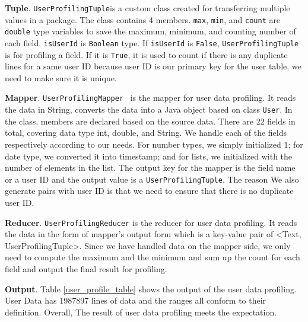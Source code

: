\documentclass{stylefiles/capstone}
\begin{document}
\textbf{Tuple}.
\texttt{UserProfilingTuple}is a custom class created for transferring multiple values in a package. The class contains 4 members. \texttt{max}, \texttt{min}, and \texttt{count} are \texttt{double} type variables to save the maximum, minimum, and counting number of each field. \texttt{isUserId} is \texttt{Boolean} type. If \texttt{isUserId} is \texttt{False}, \texttt{UserProfilingTuple} is for profiling a field. If it is \texttt{True}, it is used to count if there is any duplicate lines for a same user ID because user ID is our primary key for the user table, we need to make sure it is unique.

\textbf{Mapper}.
\texttt{UserProfilingMapper} ~is the mapper for user data profiling. It reads the data in String, converts the data into a Java object based on class \texttt{User}. In the class, members are declared based on the source data. There are 22 fields in total, covering data type int, double, and String. We handle each of the fields respectively according to our needs. For number types, we simply initialized 1; for date type, we converted it into timestamp; and for lists, we initialized with the number of elements in the list. The output key for the mapper is the field name or a user ID and the output value is a \texttt{UserProfilingTuple}. The reason We also generate pairs with user ID is that we need to ensure that there is no duplicate user ID.

\textbf{Reducer}.
\texttt{UserProfilingReducer} is the reducer for user data profiling. It reads the data in the form of mapper's output form which is a key-value pair of <Text, UserProfilingTuple>. Since we have handled data on the mapper side, we only need to compute the maximum and the minimum and sum up the count for each field and output the final result for profiling.

\textbf{Output}.
Table \ref{user_profile_table} shows the output of the user data profiling. User Data has 1987897 lines of data and the ranges all conform to their definition. Overall, The result of user data profiling meets the expectation.
\end{document}
